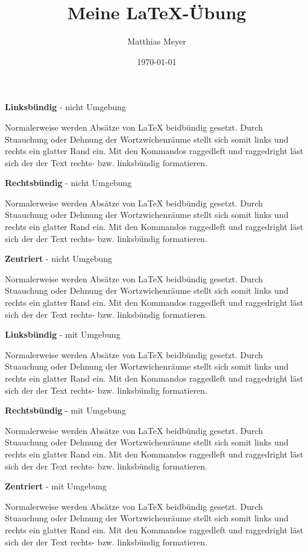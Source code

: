 \documentclass[a4paper,twoside,10pt]{article}
\author{Matthias Meyer}
\title{Meine LaTeX-Übung}
\date{\today}
\begin{document}
\textbf{Linksbündig} - nicht Umgebung

\raggedright Normalerweise werden Absätze von LaTeX beidbündig gesetzt. Durch Stuauchung oder Dehnung der Wortzwichenräume stellt sich somit links und rechts ein glatter Rand ein. Mit den Kommandos raggedleft und raggedright läst sich der der Text rechts- bzw. linksbündig formatieren.

\justifying
\textbf{Rechtsbündig} - nicht Umgebung

\raggedleft Normalerweise werden Absätze von LaTeX beidbündig gesetzt. Durch Stuauchung oder Dehnung der Wortzwichenräume stellt sich somit links und rechts ein glatter Rand ein. Mit den Kommandos raggedleft und raggedright läst sich der der Text rechts- bzw. linksbündig formatieren.

\justifying
\textbf{Zentriert} - nicht Umgebung

\centering Normalerweise werden Absätze von LaTeX beidbündig gesetzt. Durch Stuauchung oder Dehnung der Wortzwichenräume stellt sich somit links und rechts ein glatter Rand ein. Mit den Kommandos raggedleft und raggedright läst sich der der Text rechts- bzw. linksbündig formatieren.

\justifying
\textbf{Linksbündig} - mit Umgebung

\begin{flushleft}
    Normalerweise werden Absätze von LaTeX beidbündig gesetzt. Durch Stuauchung oder Dehnung der Wortzwichenräume stellt sich somit links und rechts ein glatter Rand ein. Mit den Kommandos raggedleft und raggedright läst sich der der Text rechts- bzw. linksbündig formatieren.
\end{flushleft}

\textbf{Rechtsbündig} - mit Umgebung

\begin{flushright}
    Normalerweise werden Absätze von LaTeX beidbündig gesetzt. Durch Stuauchung oder Dehnung der Wortzwichenräume stellt sich somit links und rechts ein glatter Rand ein. Mit den Kommandos raggedleft und raggedright läst sich der der Text rechts- bzw. linksbündig formatieren.
\end{flushright}

\textbf{Zentriert} - mit Umgebung

\begin{center}
    Normalerweise werden Absätze von LaTeX beidbündig gesetzt. Durch Stuauchung oder Dehnung der Wortzwichenräume stellt sich somit links und rechts ein glatter Rand ein. Mit den Kommandos raggedleft und raggedright läst sich der der Text rechts- bzw. linksbündig formatieren.
\end{center}
\end{document}
